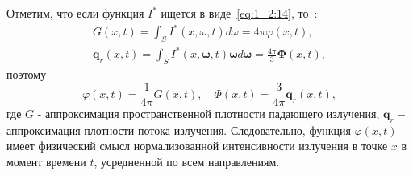 Отметим, что если функция $I^*$ ищется в виде~\eqref{eq:1_2:14},
то~\cite[502]{modest2013radiative}:
\begin{gather*}
    G(x, t)=\int_{S} I^{*}(x, \omega, t) d \omega=4 \pi \varphi(x, t), \\
    \mathbf{q}_{r}(x, t)=\int_{S} I^{*}(x, \boldsymbol{\omega}, t)
    \boldsymbol{\omega} d \boldsymbol{\omega}=\frac{4 \pi}{3} \boldsymbol{\Phi}(x, t),
\end{gather*}
поэтому
\[
    \varphi(x, t)=\frac{1}{4 \pi} G(x, t),
    \quad \Phi(x, t)=\frac{3}{4 \pi} \mathbf{q}_{r}(x, t),
\]
где $G$ - аппроксимация пространственной плотности падающего излучения,
$\mathbf{q}_{r}-$ аппроксимация плотности потока излучения.
Следовательно, функция $\varphi(x, t)$ имеет физический смысл
нормализованной интенсивности излучения в
точке $x$ в момент времени $t$, усредненной по всем направлениям.

